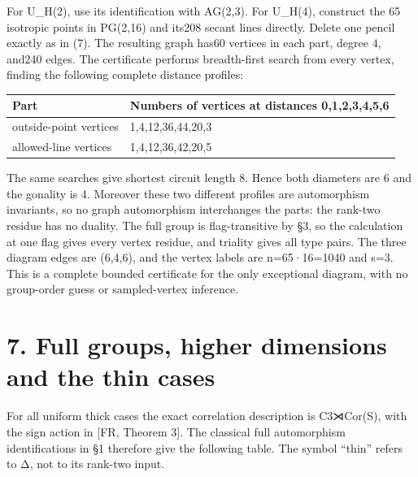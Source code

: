 \documentclass[
  11pt,
  a4paper,
]{article}
\newcounter{none} %
\begin{document}
For U\_H(2), use its identification with AG(2,3). For U\_H(4), construct
the 65 isotropic points in PG(2,16) and its208 secant lines directly.
Delete one pencil exactly as in (7). The resulting graph has60 vertices
in each part, degree 4, and240 edges. The certificate performs
breadth-first search from every vertex, finding the following complete
distance profiles:

{\def\LTcaptype{none} %
\begin{longtable}[]{@{}ll@{}}
\toprule\noalign{}
Part & Numbers of vertices at distances 0,1,2,3,4,5,6 \\
\midrule\noalign{}
\endhead
\bottomrule\noalign{}
\endlastfoot
outside-point vertices & 1,4,12,36,44,20,3 \\
allowed-line vertices & 1,4,12,36,42,20,5 \\
\end{longtable}
}

The same searches give shortest circuit length 8. Hence both diameters
are 6 and the gonality is 4. Moreover these two different profiles are
automorphism invariants, so no graph automorphism interchanges the
parts: the rank-two residue has no duality. The full group is
flag-transitive by §3, so the calculation at one flag gives every vertex
residue, and triality gives all type pairs. The three diagram edges are
(6,4,6), and the vertex labels are n=65·16=1040 and s=3. This is a
complete bounded certificate for the only exceptional diagram, with no
group-order guess or sampled-vertex inference.

\section{7. Full groups, higher dimensions and the thin
cases}\label{full-groups-higher-dimensions-and-the-thin-cases}

For all uniform thick cases the exact correlation description is
C3⋊Cor(S), with the sign action in {[}FR, Theorem 3{]}. The classical
full automorphism identifications in §1 therefore give the following
table. The symbol ``thin'' refers to Δ, not to its rank-two input.
\end{document}
